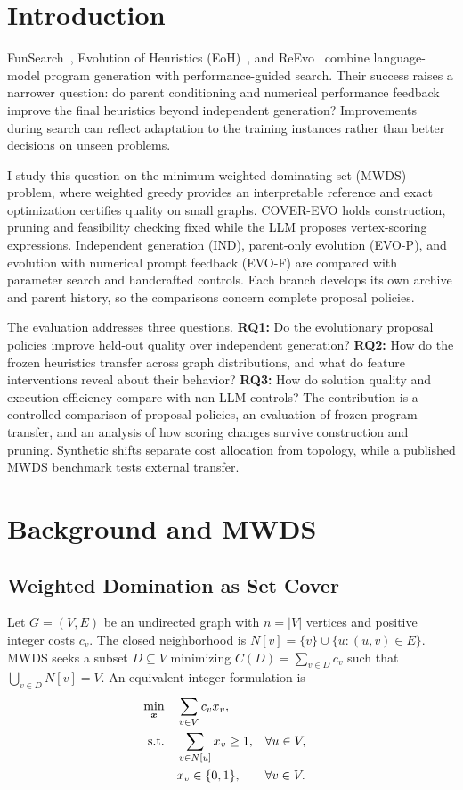 \section{Introduction}

FunSearch~\cite{funsearch}, Evolution of Heuristics (EoH)~\cite{eoh},
and ReEvo~\cite{reevo} combine language-model program generation with
performance-guided search. Their success raises a narrower question:
do parent conditioning and numerical performance feedback improve the
final heuristics beyond independent generation? Improvements during
search can reflect adaptation to the training instances rather than
better decisions on unseen problems.

I study this question on the minimum weighted dominating set (MWDS)
problem, where weighted greedy provides an interpretable reference and
exact optimization certifies quality on small graphs. COVER-EVO holds
construction, pruning and feasibility checking fixed while the LLM
proposes vertex-scoring expressions. Independent generation (IND),
parent-only evolution (EVO-P), and evolution with numerical prompt
feedback (EVO-F) are compared with parameter search and handcrafted
controls. Each branch develops its own archive and parent history,
so the comparisons concern complete proposal policies.

The evaluation addresses three questions.
\textbf{RQ1:} Do the evolutionary proposal policies improve held-out quality
over independent generation?
\textbf{RQ2:} How do the frozen heuristics transfer across graph distributions,
and what do feature interventions reveal about their behavior?
\textbf{RQ3:} How do solution quality and execution efficiency compare with
non-LLM controls?
The contribution is a controlled comparison of proposal policies,
an evaluation of frozen-program transfer, and an analysis of how
scoring changes survive construction and pruning. Synthetic shifts
separate cost allocation from topology, while a published MWDS
benchmark tests external transfer.

\section{Background and MWDS}

\subsection{Weighted Domination as Set Cover}

Let $G=(V,E)$ be an undirected graph with $n=|V|$ vertices
and positive integer costs $c_v$. The closed neighborhood is
$N[v]=\{v\}\cup\{u:(u,v)\in E\}$.
MWDS seeks a subset $D\subseteq V$ minimizing
$C(D)=\sum_{v\in D}c_v$ such that
$\bigcup_{v\in D}N[v]=V$.
An equivalent integer formulation is
\begin{align}
\min_{\boldsymbol{x}}\quad
    &\sum_{v\in V}c_vx_v, \label{eq:ilp}\\
\text{s.t.}\quad
    &\sum_{v\in N[u]}x_v\geq 1,
    &&\forall u\in V, \notag\\
    &x_v\in\{0,1\},
    &&\forall v\in V. \notag
\end{align}

